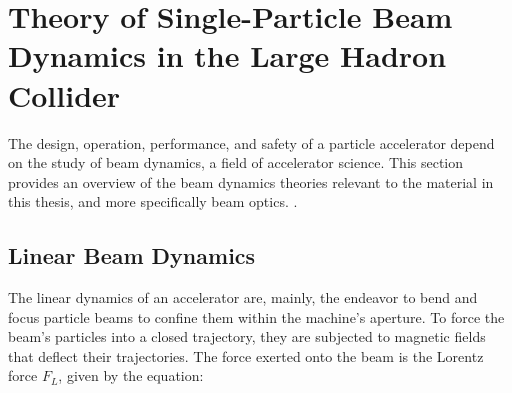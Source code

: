 \chapter{Theory of Single-Particle Beam Dynamics in the Large Hadron Collider} %

\label{Chapter:Theory} %


The design, operation, performance, and safety of a particle accelerator depend on the study of beam dynamics, a field of accelerator science.
This section provides an overview of the beam dynamics theories relevant to the material in this thesis, and more specifically beam optics.
.


\section{Linear Beam Dynamics}

The linear dynamics of an accelerator are, mainly, the endeavor to bend and focus particle beams to confine them within the machine's aperture.
To force the beam's particles into a closed trajectory, they are subjected to magnetic fields that deflect their trajectories.
The force exerted onto the beam is the Lorentz force \(F_{L}\), given by the equation:

